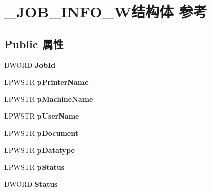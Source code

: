 \hypertarget{struct___j_o_b___i_n_f_o__1_w}{}\section{\+\_\+\+J\+O\+B\+\_\+\+I\+N\+F\+O\+\_\+W结构体 参考}
\label{struct___j_o_b___i_n_f_o__1_w}
\subsection*{Public 属性}
\begin{DoxyCompactItemize}
\item 
\mbox{\label{struct___j_o_b___i_n_f_o__1_w_a0cdcf6353bca57b7e7c1e95440c53573}} 
D\+W\+O\+RD {\bfseries Job\+Id}
\item 
\mbox{\label{struct___j_o_b___i_n_f_o__1_w_a2b63cc53e0cd804c1069ac7ce6955764}} 
L\+P\+W\+S\+TR {\bfseries p\+Printer\+Name}
\item 
\mbox{\label{struct___j_o_b___i_n_f_o__1_w_a0706a1edf414fc68a5975c60e0ae6e02}} 
L\+P\+W\+S\+TR {\bfseries p\+Machine\+Name}
\item 
\mbox{\label{struct___j_o_b___i_n_f_o__1_w_ab5a86e6d6962f3dc402af9f4a30a0974}} 
L\+P\+W\+S\+TR {\bfseries p\+User\+Name}
\item 
\mbox{\label{struct___j_o_b___i_n_f_o__1_w_a7ca0f7c5b4735db53b5e2fa7db3c8a2a}} 
L\+P\+W\+S\+TR {\bfseries p\+Document}
\item 
\mbox{\label{struct___j_o_b___i_n_f_o__1_w_af7833200fd39b8c2a7d03924509b10b3}} 
L\+P\+W\+S\+TR {\bfseries p\+Datatype}
\item 
\mbox{\label{struct___j_o_b___i_n_f_o__1_w_a703c73232436abec84d5130669fb4cdf}} 
L\+P\+W\+S\+TR {\bfseries p\+Status}
\item 
\mbox{\label{struct___j_o_b___i_n_f_o__1_w_abba3d5a20657918f2a3a565c881d56bc}} 
D\+W\+O\+RD {\bfseries Status}
\item 

\end{DoxyCompactItemize}
